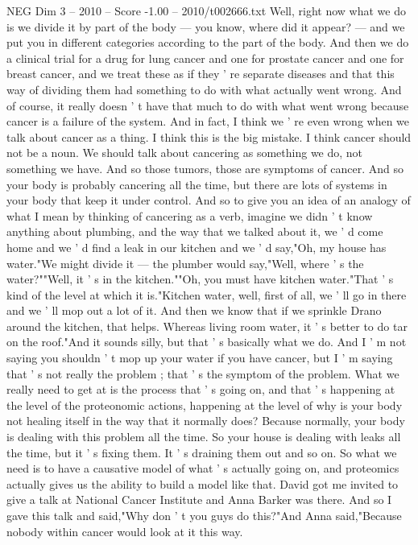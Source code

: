 \begin{textsample}{NEG Dim 3 – 2010 – Score -1.00 – 2010/t002666.txt}
Well, right now what we do is we divide it by part of the body — you know, where did it appear? — and we put you in different categories according to the part of the body.
And then we do a clinical trial for a drug for lung cancer and one for prostate cancer and one for breast cancer, and we treat these as if they ' re separate diseases and that this way of dividing them had something to do with what actually went wrong.
And of course, it really doesn ' t have that much to do with what went wrong because cancer is a failure of the system.
And in fact, I think we ' re even wrong when we talk about cancer as a thing.
I think this is the big mistake.
I think cancer should not be a noun.
We should talk about cancering as something we do, not something we have.
And so those tumors, those are symptoms of cancer.
And so your body is probably cancering all the time, but there are lots of systems in your body that keep it under control.
And so to give you an idea of an analogy of what I mean by thinking of cancering as a verb, imagine we didn ' t know anything about plumbing, and the way that we talked about it, we ' d come home and we ' d find a leak in our kitchen and we ' d say,"Oh, my house has water."We might divide it — the plumber would say,"Well, where ' s the water?""Well, it ' s in the kitchen.""Oh, you must have kitchen water."That ' s kind of the level at which it is."Kitchen water, well, first of all, we ' ll go in there and we ' ll mop out a lot of it.
And then we know that if we sprinkle Drano around the kitchen, that helps.
Whereas living room water, it ' s better to do tar on the roof."And it sounds silly, but that ' s basically what we do.
And I ' m not saying you shouldn ' t mop up your water if you have cancer, but I ' m saying that ' s not really the problem ; that ' s the symptom of the problem.
What we really need to get at is the process that ' s going on, and that ' s happening at the level of the proteonomic actions, happening at the level of why is your body not healing itself in the way that it normally does?
Because normally, your body is dealing with this problem all the time.
So your house is dealing with leaks all the time, but it ' s fixing them.
It ' s draining them out and so on.
So what we need is to have a causative model of what ' s actually going on, and proteomics actually gives us the ability to build a model like that.
David got me invited to give a talk at National Cancer Institute and Anna Barker was there.
And so I gave this talk and said,"Why don ' t you guys do this?"And Anna said,"Because nobody within cancer would look at it this way.

\end{textsample}
